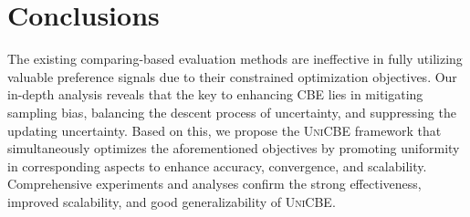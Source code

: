 \section{Conclusions}
The existing comparing-based evaluation methods are ineffective in fully utilizing valuable preference signals due to their constrained optimization objectives. 
Our in-depth analysis reveals that the key to enhancing CBE lies in mitigating sampling bias, balancing the descent process of uncertainty, and suppressing the updating uncertainty.
Based on this, we propose the \textsc{UniCBE} framework that simultaneously optimizes the aforementioned objectives by promoting uniformity in corresponding aspects to enhance accuracy, convergence, and scalability.
Comprehensive experiments and analyses confirm the strong effectiveness, improved scalability, and good generalizability of \textsc{UniCBE}.